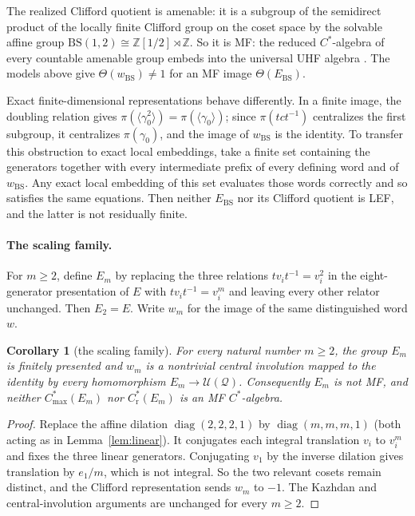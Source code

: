 \documentclass[11pt]{amsart}
\newcommand{\leanverified}[2]{\ignorespaces}
\newtheorem{corollary}[theorem]{Corollary}
\theoremstyle{definition}
\theoremstyle{remark}
\theoremstyle{plain}
\newcommand{\U}{\mathcal U}
\newcommand{\Cmax}{C^*_{\mathrm{max}}}
\newcommand{\Cred}{C^*_{\mathrm r}}
\begin{document}
The realized Clifford quotient is amenable: it is a subgroup of
the semidirect product of the locally finite Clifford group on the
coset space by the solvable affine group
$\mathrm{BS}(1,2)\cong\mathbb Z[1/2]\rtimes\mathbb Z$.  So it is MF: the reduced $C^*$-algebra of every countable
amenable group embeds into the universal UHF algebra
\cite[Theorem~B]{SchafhauserAF}.  The models above give
$\Theta(w_{\mathrm{BS}})\ne1$ for an MF image
$\Theta(E_{\mathrm{BS}})$.

Exact finite-dimensional representations behave differently.  In a finite image, the
doubling relation gives
$\pi(\langle\gamma_0^2\rangle)=\pi(\langle\gamma_0\rangle)$; since
$\pi(tct^{-1})$ centralizes the first subgroup, it centralizes
$\pi(\gamma_0)$, and the image of $w_{\mathrm{BS}}$ is the identity.
To transfer this obstruction to exact local embeddings, take a finite
set containing the generators together with every intermediate prefix
of every defining word and of $w_{\mathrm{BS}}$.  Any exact local
embedding of this set evaluates those words correctly and so
satisfies the same equations.  Then neither
$E_{\mathrm{BS}}$ nor its Clifford quotient is LEF, and the latter is
not residually finite.
\leanverified{Monsters/CyclicBaseLEFObstruction}{GroupApproximation.CyclicBaseLEFObstruction.cyclicBase_exactModel_package}

\paragraph{The scaling family.}
For $m\ge2$, define $E_m$ by replacing the three relations
$tv_i t^{-1}=v_i^2$ in the eight-generator presentation of $E$ with
$tv_i t^{-1}=v_i^m$ and leaving every other relator unchanged.  Then
$E_2=E$.  Write $w_m$ for the image of the same
distinguished word $w$.

\begin{corollary}[the scaling family]\label{cor:scaling-family}
For every natural number $m\ge2$, the group $E_m$ is finitely presented and
$w_m$ is a nontrivial central involution mapped to the identity by every
homomorphism $E_m\to\U(\mathcal Q)$.  Consequently $E_m$ is not MF,
and neither $\Cmax(E_m)$ nor $\Cred(E_m)$ is an MF $C^*$-algebra.
\leanverified{Sofic/ScalingFamilyEndpoint}{GroupApproximation.ScalingFamilyEndpoint.manuscriptTheoremFamily}
\end{corollary}

\begin{proof}
Replace the affine dilation $\operatorname{diag}(2,2,2,1)$ by
$\operatorname{diag}(m,m,m,1)$ (both acting as in
Lemma~\ref{lem:linear}).  It conjugates each integral translation
$v_i$ to $v_i^m$ and fixes the three linear generators.  Conjugating
$v_1$ by the inverse dilation gives translation by $e_1/m$, which is
not integral.  So the two relevant cosets remain distinct, and the
Clifford representation sends $w_m$ to $-1$.  The Kazhdan and
central-involution arguments are unchanged for every $m\ge2$.
\end{proof}
\end{document}
